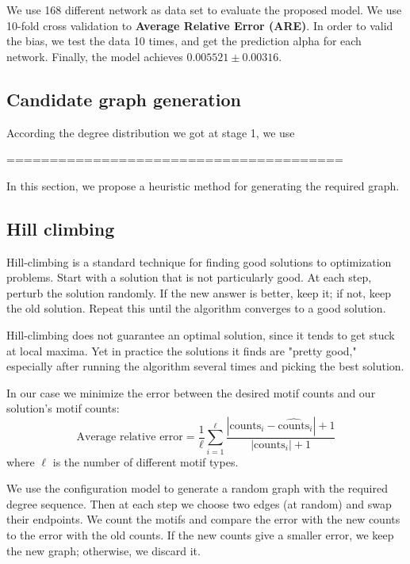 We use 168 different network as data set to evaluate the proposed model. We use 10-fold cross validation to \textbf{Average Relative Error (ARE)}. In order to valid the bias, we test the data 10 times, and get the prediction alpha for each network. Finally, the model achieves $0.005521 \pm 0.00316$.

\subsection{Candidate graph generation}

According the degree distribution we got at stage 1, we use 


=======================================

In this section, we propose a heuristic method for generating the required
graph.

\subsection{Hill climbing}
Hill-climbing is a standard technique for finding good solutions to optimization problems.  Start with a solution that is not particularly good.  At each step, perturb the solution randomly.  If the new answer is better, keep it; if not, keep the old solution.  Repeat this until the algorithm converges to a good solution.

Hill-climbing does not guarantee an optimal solution, since it tends to get stuck at local maxima.  Yet in practice the solutions it finds are "pretty good," especially after running the algorithm several times and picking the best solution.

In our case we minimize the error between the desired motif counts and our solution's motif counts:
\begin{equation}
\label{eqn:avgRelativeError}
\mbox{Average relative error} = \frac{1}{\ell} \sum_{i = 1}^{\ell} \frac{|\mbox{counts}_i - \widehat{\mbox{counts}}_i| + 1}{|\mbox{counts}_i| + 1}
\end{equation}
where $\ell$ is the number of different motif types.

We use the configuration model to generate a random graph with the required degree sequence.  Then at each step we choose two edges (at random) and swap their endpoints.  We count the motifs and compare the error with the new counts to the error with the old counts.  If the new counts give a smaller error, we keep the new graph; otherwise, we discard it.

